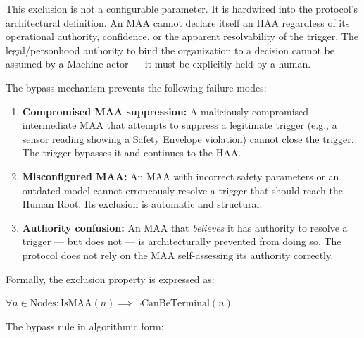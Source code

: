 \medskip
\noindent This exclusion is not a configurable parameter. It is hardwired into the protocol's architectural definition. An MAA cannot declare itself an HAA regardless of its operational authority, confidence, or the apparent resolvability of the trigger. The legal/personhood authority to bind the organization to a decision cannot be assumed by a Machine actor — it must be explicitly held by a human.

\medskip
\noindent The bypass mechanism prevents the following failure modes:

\begin{enumerate}
  \item \textbf{Compromised MAA suppression:} A maliciously compromised intermediate MAA that attempts to suppress a legitimate trigger (e.g., a sensor reading showing a Safety Envelope violation) cannot close the trigger. The trigger bypasses it and continues to the HAA.

  \item \textbf{Misconfigured MAA:} An MAA with incorrect safety parameters or an outdated model cannot erroneously resolve a trigger that should reach the Human Root. Its exclusion is automatic and structural.

  \item \textbf{Authority confusion:} An MAA that \emph{believes} it has authority to resolve a trigger — but does not — is architecturally prevented from doing so. The protocol does not rely on the MAA self-assessing its authority correctly.
\end{enumerate}

Formally, the exclusion property is expressed as:

\begin{center}
$\forall n \in \text{Nodes}: \text{IsMAA}(n) \implies \neg \text{CanBeTerminal}(n)$
\end{center}

\bigskip
\noindent The bypass rule in algorithmic form:

\begin{algorithm}
\caption{Bypass Rule — Machine Actor Exclusion}
\begin{algorithmic}[1]
    \State {}
    \State $\text{HumanRootProcess}(n, pkg)$
    \State {}
    \State $directive \gets \text{GenerateDirective}(n, pkg)$
    \State $\text{SendDirectiveDown}(pkg.\text{originating\_node}, directive)$
    \State $pkg.\text{status} \gets \text{RESOLVED}$
  \Else}
    \State \Comment{MAA cannot resolve — BYPASS this actor, propagate upward}
    \State $\text{PropagateUpward}(n.\text{parent}, pkg)$
  \EndIf
\EndProcedure
\end{algorithmic}
\end{algorithm}

